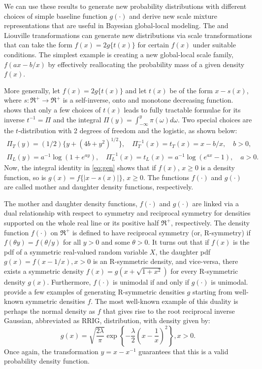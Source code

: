 \documentclass[11pt]{article}
\begin{document}
We can use these results to generate new probability distributions with different choices of simple baseline function $g(\cdot)$ and derive new scale mixture representations that are useful in Bayesian global-local modeling. The \CS{} and Liouville transformations can generate new distributions via scale transformations that can take the form $f(x) = 2 g\{ t(x) \}$ for certain $f(x)$ under suitable conditions. The simplest example is creating a new global-local scale family, $f(a x - b/x)$ by effectively reallocating the probability mass of a given density $f(x)$. 

More generally, let $f(x) = 2g\{ t(x) \}$ and let $t(x)$ be of the form $x-s(x)$, where $s : \Re^+ \to \Re^+$ is a self-inverse, onto and monotone decreasing function.    \citet{jones_generating_2014} shows that only a few choices of $t(x)$ leads to fully tractable formulae for its inverse $t^{-1}= \Pi$ and the integral 
$\Pi(y) = \int_{-\infty}^{y} \pi(\omega) d\omega$. Two special choices are the $t$-distribution with 2 degrees of freedom and the logistic, as shown below:
\begin{align*}
\Pi_{T}(y) = (1/2)\{ y+(4b+y^2)^{1/2}\}, \quad \Pi_T^{-1}(x) = t_T(x) = x - b/x, \quad b >0,\\
\Pi_{L}(y) = a^{-1} \log(1+e^{ay}), \quad \Pi_L^{-1}(x) = t_L(x) = a^{-1} \log(e^{ax}-1), \quad a>0.
\end{align*}
Now, the integral identity in \eqref{eq:gen} shows that if $f(x)$, $x \geq 0$ is a density function, so is $g(x) = f\{\lvert x-s(x) \rvert\}$, $x \ge 0$.  The functions $f(\cdot)$ and $g(\cdot)$ are called mother and daughter density functions, respectively.  %

The mother and daughter density functions, $f(\cdot)$ and $g(\cdot)$ are linked via a dual relationship with respect to symmetry and reciprocal symmetry for densities supported on the whole real line or its positive half $\Re^{+}$, respectively. The density function $f(\cdot)$ on $\Re^{+}$ is defined to have reciprocal symmetry (or, R-symmetry) if $f(\theta y) = f(\theta / y)$ for all $y > 0$ and some $\theta >0$. It turns out that if $f(x)$ is the pdf of a symmetric real-valued random variable $X$, the daughter pdf $g(x) = f(x-1/x), x>0$ is an R-symmetric density, and vice-versa, there exists a symmetric density $f(x) = g(x+\sqrt{1+x^2})$ for
every R-symmetric density $g(x)$. Furthermore, $f(\cdot)$ is unimodal if and only if $g(\cdot)$ is unimodal. \cite{chaubey2010reciprocal} provide a few examples of generating R-symmetric densities $g$ starting from well-known symmetric densities $f$. The most well-known example of this duality is perhaps the normal density as $f$ that gives rise to the root reciprocal inverse Gaussian, abbreviated as RRIG, distribution, with density given by: 
\[
g(x) = \sqrt{\frac{2\lambda}{\pi}} \exp \left\{ - \frac{\lambda}{2} \left( x - \frac{1}{x} \right)^2 \right\}, x >0.  
\]
Once again, the \CS{} transformation $y = x - x^{-1}$ guarantees that this is a valid probability density function.
\end{document}
